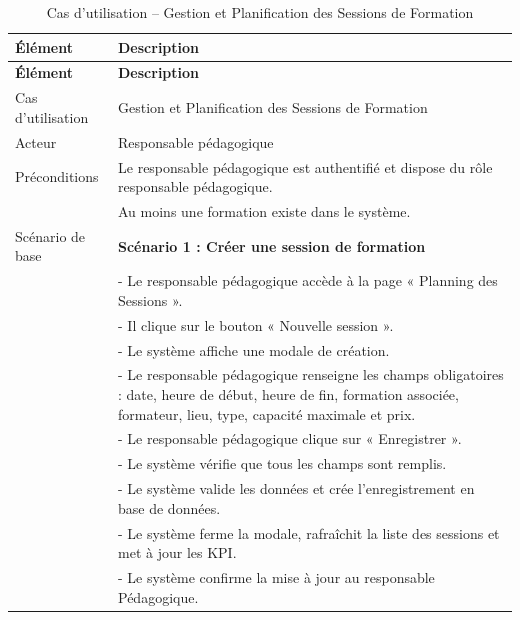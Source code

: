 {
\begin{longtable}{|l|p{12cm}|}
\caption{Cas d'utilisation -- Gestion et Planification des Sessions de Formation}
\label{tab:Gestion et Planification des Sessions de Formation} \\
\hline
\textbf{Élément} & \textbf{Description} \\
\hline
\endfirsthead
\hline
\textbf{Élément} & \textbf{Description} \\
\hline
\endhead

Cas d'utilisation & Gestion et Planification des Sessions de Formation \\
\hline

Acteur & Responsable pédagogique \\
\hline

Préconditions &
Le responsable pédagogique est authentifié et dispose du rôle responsable pédagogique. \\
& Au moins une formation existe dans le système. \\
\hline

Scénario de base &
\textbf{Scénario 1 : Créer une session de formation} \\


&- Le responsable pédagogique accède à la page « Planning des Sessions ». \\
&- Il clique sur le bouton « Nouvelle session ». \\
&- Le système affiche une modale de création. \\
&- Le responsable pédagogique renseigne les champs obligatoires : date, heure de début, heure de fin, formation associée, formateur, lieu, type, capacité maximale et prix. \\
&- Le responsable pédagogique clique sur « Enregistrer ». \\
&- Le système vérifie que tous les champs sont remplis. \\
&- Le système valide les données et crée l'enregistrement en base de données. \\
&- Le système ferme la modale, rafraîchit la liste des sessions et met à jour les KPI. \\
&- Le système confirme la mise à jour au responsable Pédagogique.


\end{longtable}}
